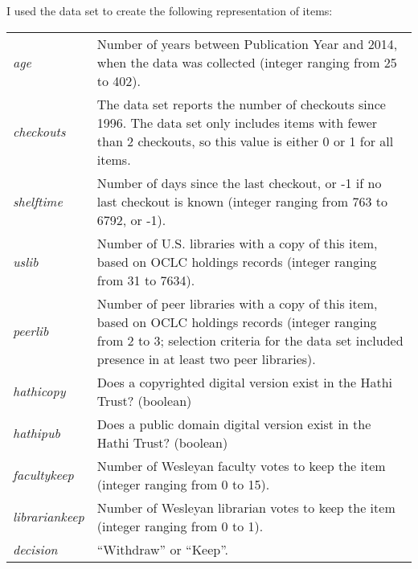 \documentclass[man,11pt]{apa6}
\begin{document}
I used the data set to create the following representation of items:
\singlespacing
\begin{center}
\begin{tabular}{|l|p{4.5in}|}
\hline
 {\em age} & Number of years between Publication Year and 2014, when the
  data was collected (integer ranging from 25 to 402). \\
 {\em checkouts} & The data set reports the number of checkouts
  since 1996.  The data set only includes items with fewer than 2
  checkouts, so this value is either 0 or 1 for all items. \\
 {\em shelftime} & Number of days since the last checkout, or -1
  if no last checkout is known (integer ranging from 763 to 6792, or -1). \\
 {\em uslib} & Number of U.S. libraries with a copy of this item,
  based on OCLC holdings records (integer ranging from 31 to 7634). \\
 {\em peerlib} & Number of peer libraries with a copy of this item,
  based on OCLC holdings records (integer ranging from 2 to 3;
  selection criteria for the data set included presence in at least
  two peer libraries). \\
 {\em hathicopy} & Does a copyrighted digital version exist in the
 Hathi Trust?  (boolean)\\
 {\em hathipub} & Does a public domain digital version exist in the
 Hathi Trust?  (boolean)\\
 {\em facultykeep} & Number of Wesleyan faculty votes to keep the item
  (integer ranging from 0 to 15). \\
 {\em librariankeep} & Number of Wesleyan librarian votes to keep the
  item (integer ranging from 0 to 1). \\
\hline
 {\em decision} & ``Withdraw'' or ``Keep''. \\
\hline
\end{tabular}
\end{center}
\doublespacing
\end{document}
